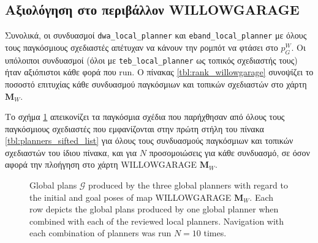 \subsection{Αξιολόγηση στο περιβάλλον WILLOWGARAGE}
  \label{subsection:02_01_04:03}

Συνολικά, οι συνδυασμοί \texttt{dwa\_local\_planner} και
\texttt{eband\_local\_planner} με όλους τους παγκόσμιους σχεδιαστές απέτυχαν να κάνουν την
ρομπότ να φτάσει στο $p_G^W$. Οι υπόλοιποι συνδυασμοί (όλοι με
\texttt{teb\_local\_planner} ως τοπικός σχεδιαστής τους) ήταν αξιόπιστοι κάθε φορά που
run. Ο πίνακας \ref{tbl:rank_willowgarage} συνοψίζει το ποσοστό επιτυχίας κάθε
συνδυασμού παγκόσμιων και τοπικών σχεδιαστών στο χάρτη $\bm{M}_W$.

Το σχήμα \ref{fig:global_plans:willowgarage} απεικονίζει τα παγκόσμια σχέδια που παρήχθησαν
από όλους τους παγκόσμιους σχεδιαστές που εμφανίζονται στην πρώτη στήλη του πίνακα
\ref{tbl:planners_sifted_list} για όλους τους συνδυασμούς παγκόσμιων και τοπικών
σχεδιαστών του ίδιου πίνακα, και για $N$ προσομοιώσεις για κάθε συνδυασμό, σε
όσον αφορά την πλοήγηση στο χάρτη WILLOWGARAGE $\bm{M}_W$.

\begin{figure}
\raggedright
  \begin{subfigure}[t]{\linewidth}
    \centering
    
  \end{subfigure}%
  \vspace{-1.5cm}
  \begin{subfigure}[t]{\linewidth}
    \centering
    
  \end{subfigure}%
  \vspace{-1.5cm}
  \begin{subfigure}[t]{\linewidth}
    \centering
    
  \end{subfigure}%
  \caption{Global plans $\bm{\mathcal{G}}$ produced by the three global
           planners with regard to the initial and goal poses of map
           WILLOWGARAGE $\bm{M}_W$. Each row depicts the global plans produced
           by one global planner when combined with each of the reviewed local
           planners. Navigation with each combination of planners was run
           $N=10$ times.}
  \label{fig:global_plans:willowgarage}
\end{figure}


